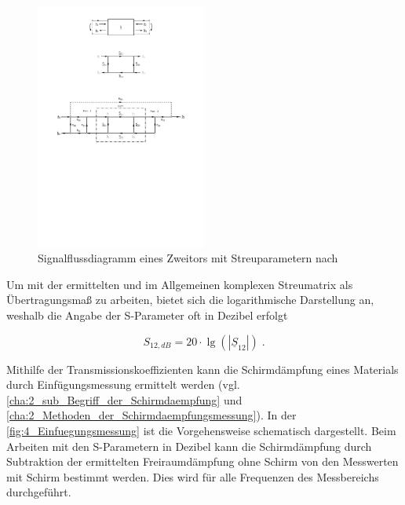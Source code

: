 \begin{figure}[ht]
    \centering
    \includegraphics[page = 1, trim = 5.9cm 19.2cm 5.9cm 5cm, clip, width = 0.5\textwidth]{Abbildungen/Kapitel4/Zweitor.pdf}
    \caption[Signalflussdiagramm eines Zweitors mit Streuparametern]{Signalflussdiagramm eines Zweitors mit Streuparametern nach~\cite{Grundkurs_Hochfrequenztechnik}}
    \label{fig:4_Signalflussdiagramm_Zweitor}
\end{figure}

Um mit der ermittelten und im Allgemeinen komplexen Streumatrix als Übertragungsmaß zu arbeiten, bietet sich die logarithmische Darstellung an, weshalb die Angabe der S-Parameter oft in Dezibel erfolgt~\cite{Grundkurs_Hochfrequenztechnik} 

\begin{equation}
    S_{12, dB} = 20 \cdot \lg \left( \left| \underline{S}_{12} \right| \right) \; \text{.} \label{eq:4_Schirmdaempfung_Dezibel}
\end{equation}


Mithilfe der Transmissionskoeffizienten kann die Schirmdämpfung eines Materials durch Einfügungs\-messung ermittelt werden (vgl. \Abschnitte\ref{cha:2_sub_Begriff_der_Schirmdaempfung} und \ref{cha:2_Methoden_der_Schirmdaempfungsmessung}). In der \Abb\ref{fig:4_Einfuegungsmessung} ist die Vorgehensweise schematisch dargestellt. Beim Arbeiten mit den S-Parametern in Dezibel kann die Schirmdämpfung durch Subtraktion der ermittelten Freiraumdämpfung ohne Schirm von den Messwerten mit Schirm bestimmt werden. Dies wird für alle Frequenzen des Messbereichs durchgeführt.
\par



